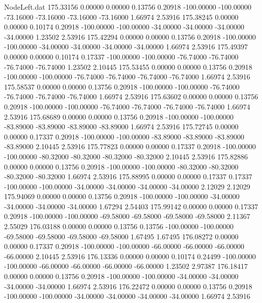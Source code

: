 \begin{filecontents}{NodeLeft.dat}
 175.33156    0.00000    0.00000     0.13756    0.20918 -100.00000 -100.00000  -73.16000  -73.16000  -73.16000  -73.16000    1.66974    2.53916
 175.38245    0.00000    0.00000     0.10174    0.20918 -100.00000 -100.00000  -34.00000  -34.00000  -34.00000  -34.00000    1.23502    2.53916
 175.42294    0.00000    0.00000     0.13756    0.20918 -100.00000 -100.00000  -34.00000  -34.00000  -34.00000  -34.00000    1.66974    2.53916
 175.49397    0.00000    0.00000     0.10174    0.17337 -100.00000 -100.00000  -76.74000  -76.74000  -76.74000  -76.74000    1.23502    2.10445
 175.53455    0.00000    0.00000     0.13756    0.20918 -100.00000 -100.00000  -76.74000  -76.74000  -76.74000  -76.74000    1.66974    2.53916
 175.58537    0.00000    0.00000     0.13756    0.20918 -100.00000 -100.00000  -76.74000  -76.74000  -76.74000  -76.74000    1.66974    2.53916
 175.63602    0.00000    0.00000     0.13756    0.20918 -100.00000 -100.00000  -76.74000  -76.74000  -76.74000  -76.74000    1.66974    2.53916
 175.68689    0.00000    0.00000     0.13756    0.20918 -100.00000 -100.00000  -83.89000  -83.89000  -83.89000  -83.89000    1.66974    2.53916
 175.72745    0.00000    0.00000     0.17337    0.20918 -100.00000 -100.00000  -83.89000  -83.89000  -83.89000  -83.89000    2.10445    2.53916
 175.77823    0.00000    0.00000     0.17337    0.20918 -100.00000 -100.00000  -80.32000  -80.32000  -80.32000  -80.32000    2.10445    2.53916
 175.82886    0.00000    0.00000     0.13756    0.20918 -100.00000 -100.00000  -80.32000  -80.32000  -80.32000  -80.32000    1.66974    2.53916
 175.88995    0.00000    0.00000     0.17337    0.17337 -100.00000 -100.00000  -34.00000  -34.00000  -34.00000  -34.00000    2.12029    2.12029
 175.94069    0.00000    0.00000     0.13756    0.20918 -100.00000 -100.00000  -34.00000  -34.00000  -34.00000  -34.00000    1.67294    2.54403
 175.99142    0.00000    0.00000     0.17337    0.20918 -100.00000 -100.00000  -69.58000  -69.58000  -69.58000  -69.58000    2.11367    2.55029
 176.03188    0.00000    0.00000     0.13756    0.13756 -100.00000 -100.00000  -69.58000  -69.58000  -69.58000  -69.58000    1.67495    1.67495
 176.08272    0.00000    0.00000     0.17337    0.20918 -100.00000 -100.00000  -66.00000  -66.00000  -66.00000  -66.00000    2.10445    2.53916
 176.13336    0.00000    0.00000     0.10174    0.24499 -100.00000 -100.00000  -66.00000  -66.00000  -66.00000  -66.00000    1.23502    2.97387
 176.18417    0.00000    0.00000     0.13756    0.20918 -100.00000 -100.00000  -34.00000  -34.00000  -34.00000  -34.00000    1.66974    2.53916
 176.22472    0.00000    0.00000     0.13756    0.20918 -100.00000 -100.00000  -34.00000  -34.00000  -34.00000  -34.00000    1.66974    2.53916

\end{filecontents}
